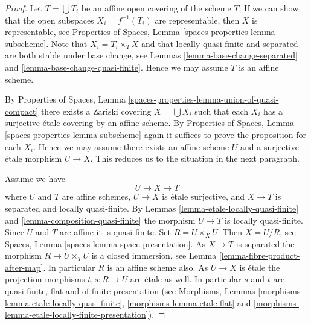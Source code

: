 \begin{proof}
Let $T = \bigcup T_i$ be an affine open covering of the scheme $T$.
If we can show that the open subspaces $X_i = f^{-1}(T_i)$ are
representable, then $X$ is representable, see
Properties of Spaces, Lemma \ref{spaces-properties-lemma-subscheme}.
Note that $X_i = T_i \times_T X$ and that locally quasi-finite and
separated are both stable under base change, see
Lemmas \ref{lemma-base-change-separated} and
\ref{lemma-base-change-quasi-finite}.
Hence we may assume $T$ is an affine scheme.

\medskip\noindent
By
Properties of Spaces,
Lemma \ref{spaces-properties-lemma-union-of-quasi-compact}
there exists a Zariski covering $X = \bigcup X_i$
such that each $X_i$ has a surjective \'etale covering by
an affine scheme. By
Properties of Spaces, Lemma \ref{spaces-properties-lemma-subscheme}
again it suffices to prove the proposition for each $X_i$.
Hence we may assume there exists an affine scheme $U$ and a
surjective \'etale morphism $U \to X$. This reduces us to the
situation in the next paragraph.

\medskip\noindent
Assume we have
$$
U \longrightarrow X \longrightarrow T
$$
where $U$ and $T$ are affine schemes, $U \to X$ is \'etale surjective, and
$X \to T$ is separated and locally quasi-finite. By
Lemmas \ref{lemma-etale-locally-quasi-finite} and
\ref{lemma-composition-quasi-finite}
the morphism $U \to T$ is locally quasi-finite.
Since $U$ and $T$ are affine it is quasi-finite.
Set $R = U \times_X U$. Then $X = U/R$, see
Spaces, Lemma \ref{spaces-lemma-space-presentation}.
As $X \to T$ is separated the
morphism $R \to U \times_T U$ is a closed immersion, see
Lemma \ref{lemma-fibre-product-after-map}.
In particular $R$ is an affine scheme also.
As $U \to X$ is \'etale the projection morphisms
$t, s : R \to U$ are \'etale as well. In particular $s$ and $t$ are
quasi-finite, flat and of finite presentation (see
Morphisms, Lemmas \ref{morphisms-lemma-etale-locally-quasi-finite},
\ref{morphisms-lemma-etale-flat} and
\ref{morphisms-lemma-etale-locally-finite-presentation}).


\end{proof}
